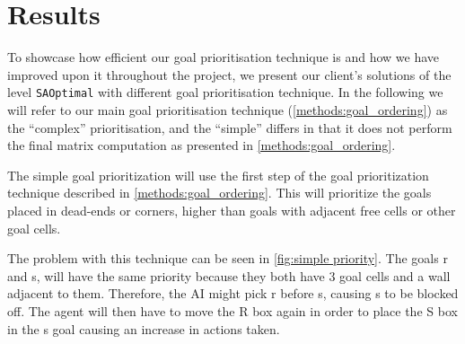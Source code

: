\section{Results}
\label{sec:results}


To showcase how efficient our goal prioritisation technique is and how we have improved upon it throughout the project, we present our client's solutions of the level \texttt{SAOptimal} with different goal prioritisation technique.
In the following we will refer to our main goal prioritisation technique (\cref{methods:goal_ordering}) as the ``complex'' prioritisation, and the ``simple'' differs in that it does not perform the final matrix computation as presented in \cref{methods:goal_ordering}.

The simple goal prioritization will use the first step of the goal prioritization technique described in \cref{methods:goal_ordering}. 
This will prioritize the goals placed in dead-ends or corners, higher than goals with adjacent free cells or other goal cells.

The problem with this technique can be seen in \cref{fig:simple priority}. 
The goals r and s, will have the same priority because they both have 3 goal cells and a wall adjacent to them. 
Therefore, the AI might pick r before s, causing s to be blocked off. 
The agent will then have to move the R box again in order to place the S box in the s goal causing an increase in actions taken.

